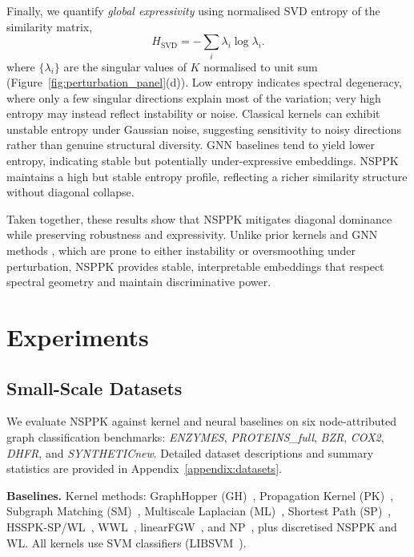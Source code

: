 Finally, we quantify \emph{global expressivity} using normalised SVD entropy of
the similarity matrix,
\[
H_{\mathrm{SVD}} = -\sum_i \lambda_i \log \lambda_i.
\]
where $\{\lambda_i\}$ are the singular values of $K$ normalised to unit sum
(Figure~\ref{fig:perturbation_panel}(d)). Low entropy indicates spectral
degeneracy, where only a few singular directions explain most of the variation;
very high entropy may instead reflect instability or noise. Classical kernels can
exhibit unstable entropy under Gaussian noise, suggesting sensitivity to noisy
directions rather than genuine structural diversity. GNN baselines tend to yield
lower entropy, indicating stable but potentially under-expressive embeddings.
NSPPK maintains a high but stable entropy profile, reflecting a richer
similarity structure without diagonal collapse.

Taken together, these results show that NSPPK mitigates diagonal dominance while
preserving robustness and expressivity. Unlike prior kernels
\citep{shervashidze2009efficient,yanardag2015deep,neumann2016propagation} and
GNN methods \citep{xu2019powerful,yi2022graph,sun2019infograph}, which are prone
to either instability or oversmoothing under perturbation, NSPPK provides stable,
interpretable embeddings that respect spectral geometry and maintain
discriminative power.

\section{Experiments}
\label{sec:experiments}

\subsection{Small-Scale Datasets}
\label{sec:small_datasets}

We evaluate NSPPK against kernel and neural baselines on six node-attributed
graph classification benchmarks: \emph{ENZYMES},
\emph{PROTEINS\_full}, \emph{BZR}, \emph{COX2}, \emph{DHFR}, and
\emph{SYNTHETICnew}. Detailed dataset descriptions and summary statistics are
provided in Appendix~\ref{appendix:datasets}.


\textbf{Baselines.}
Kernel methods: GraphHopper (GH)~\citep{feragen2013scalable}, Propagation Kernel (PK)~\citep{neumann2016propagation}, Subgraph Matching (SM)~\citep{kriege2012subgraph}, Multiscale Laplacian (ML)~\citep{kondor2016multiscalelaplaciangraphkernel}, Shortest Path (SP)~\citep{borgwardt2005shortest}, HSSPK-SP/WL~\citep{morris2016fasterkernelsgraphscontinuous}, WWL~\citep{togninalli2019wasserstein}, linearFGW~\citep{nguyen2023linearfgw}, and NP~\citep{fang2023neighborhoodpreserving}, plus discretised NSPPK and WL.
All kernels use SVM classifiers (LIBSVM~\citep{chang2011libsvm}).

